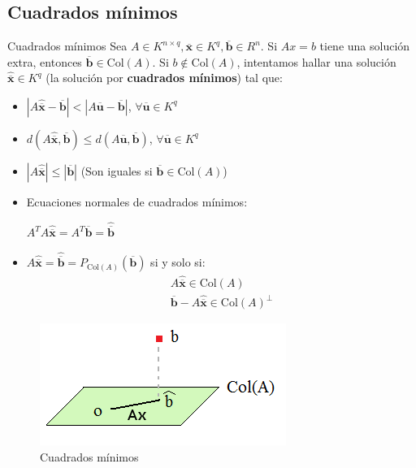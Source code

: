 \documentclass[a4paper, twoside]{article}
\numberwithin{equation}{section}
\numberwithin{figure}{section}
\numberwithin{table}{section}
\newcommand{\vect}[1]{\overline{\textbf{#1}}}
\newcommand{\col}[1]{\text{Col}(#1)}
\newcommand{\dete}[1]{\left\vert #1 \right\vert}
\begin{document}
\subsection{Cuadrados mínimos}
\begin{definicion*}{Cuadrados mínimos}
	Sea $A \in K^{n \times q}, \vect{x} \in K^q, \vect{b} \in R^n$. Si $Ax=b$ tiene una solución extra, entonces $\vect{b} \in \col{A}$. Si $b \notin \col{A}$, intentamos hallar una solución $\hat{\vect{x}} \in K^q$ (la solución por \textbf{cuadrados mínimos}) tal que:
	
	\begin{minipage}{0.65\textwidth}
		\begin{itemize}
			\item $\dete{A\hat{\vect{x}}-\vect{b}} < \dete{A\vect{u}-\vect{b}}$, $\forall \vect{u} \in K^q$	
			\item $d(A\hat{\vect{x}},\vect{b}) \leq d(A\vect{u},\vect{b})$, $ \forall \vect{u} \in K^q$
			\item $\dete{A\hat{\vect{x}}} \leq \dete{\vect{b}}$ (Son iguales si $\vect{b} \in \col{A}$)
			\item Ecuaciones normales de cuadrados mínimos: 
			
			$A^T A \hat{\vect{x}}=A^T \vect{b}=\hat{\vect{b}}$
			\item $A \hat{\vect{x}}=\hat{\vect{b}}=P_{\col{A}}(\vect{b})$ si y solo si:
				\begin{align}
					A\hat{\vect{x}} \in \col{A} \\
					\vect{b}-A\hat{\vect{x}} \in \col{A}^\bot
				\end{align}
		\end{itemize}
	\end{minipage}
	\begin{minipage}{0.3\textwidth}
		\begin{flushright}
			\begin{figure}[H]
				\includegraphics[scale=0.4]{cuad_min}
				\caption{Cuadrados mínimos}
			\end{figure}
		\end{flushright}
	\end{minipage}
\end{definicion*}
\end{document}
